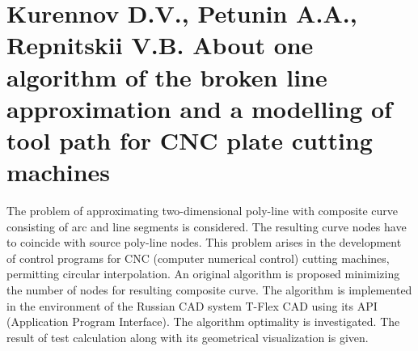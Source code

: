 \section*{Kurennov D.V., Petunin A.A., Repnitskii V.B.
About one algorithm of the broken line approximation and a modelling of tool path
for CNC plate cutting machines}

The problem of approximating two-dimensional poly-line
with composite curve consisting of arc and line segments
is considered.
The resulting curve nodes have to coincide with source poly-line nodes.
This problem arises in the development of control programs
for CNC (computer numerical control) cutting machines,
permitting circular interpolation.
An original algorithm is proposed
minimizing the number of nodes for resulting composite curve.
The algorithm is implemented in the environment of the Russian CAD system 
T-Flex CAD using its API (Application Program Interface).
The algorithm optimality is investigated.
The result of test calculation along with its geometrical visualization is given.
